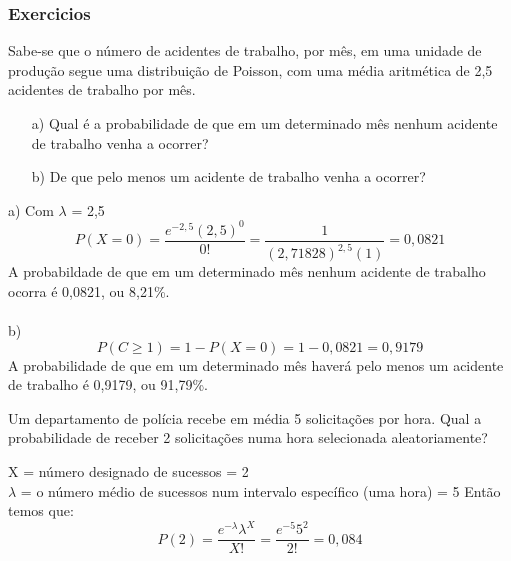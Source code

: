 \documentclass[10pt,a4paper]{article}
\begin{document}
\subsubsection{Exercicios}
\begin{ex}
	Sabe-se que o número de acidentes de trabalho, por mês, em uma unidade de produção segue uma distribuição de Poisson, com uma média aritmética de 2,5  acidentes de trabalho por mês.
	\begin{itemize}
		\item[a)] Qual é a probabilidade de que em um determinado mês nenhum acidente de trabalho venha a ocorrer?
		\item[b)] De que pelo menos um acidente de trabalho venha a ocorrer?
	\end{itemize}
\end{ex}

\begin{sol}
	a) Com $\lambda$ = 2,5
	\[
		P(X = 0) = \frac{e^{-2,5}(2,5)^{0}}{0!} = \frac{1}{(2,71828)^{2,5}(1)} = 0,0821
	\]
	A probabildade de que em um determinado mês nenhum acidente de trabalho ocorra é 0,0821,  ou 8,21\%.\\\\
	b) 
	\[
		P(C \geq 1) = 1 - P(X = 0) = 1 - 0,0821 = 0,9179
	\]
	A probabilidade de que em um determinado mês haverá pelo menos um acidente de trabalho é  0,9179, ou 91,79\%.
\end{sol}

\begin{ex}
	Um departamento de polícia recebe em média 5 solicitações por hora.  Qual  a  probabilidade  de  receber  2 solicitações numa hora selecionada aleatoriamente? 
\end{ex}
\begin{sol}
	X = número designado de sucessos = 2 \\
	$\lambda$ = o número médio de sucessos num intervalo específico (uma hora) = 5 
	Então temos que:
	\[P(2) = \frac{e^{-\lambda}\lambda^{X}}{X!}	= \frac{e^{-5}5^{2}}{2!} = 0,084\]
\end{sol}
\end{document}
